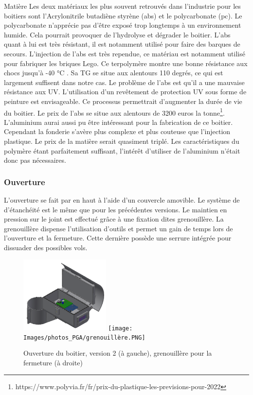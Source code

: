 Matière
Les deux matériaux les plus souvent retrouvés dans l’industrie pour les boitiers sont l’Acrylonitrile 
butadiène styrène (abs) et le polycarbonate (pc). Le polycarbonate n’apprécie pas d’être exposé trop 
longtemps à un environnement humide. Cela pourrait provoquer de l’hydrolyse et dégrader le boitier. 
L’abs quant à lui est très résistant, il est notamment utilisé pour faire des barques de secours.  
L’injection de l’abs est très rependue, ce matériau est notamment utilisé pour fabriquer les briques Lego. 
Ce terpolymère montre une bonne résistance aux chocs jusqu'à -40 °C . Sa TG se situe aux alentours 110 
degrés, ce qui est largement suffisent dans notre cas. Le problème de l’abs est qu’il a une mauvaise 
résistance aux UV. L’utilisation d’un revêtement de protection UV sous forme de peinture est envisageable. 
Ce processus permettrait d’augmenter la durée de vie du boitier. Le prix de l’abs se situe aux alentours 
de 3200 euros la tonne\footnote{https://www.polyvia.fr/fr/prix-du-plastique-les-previsions-pour-2022}.\\
L’aluminium aurai aussi pu être intéressant pour la fabrication de ce boitier. Cependant la fonderie 
s’avère plus complexe et plus couteuse que l’injection plastique. Le prix de la matière serait quasiment 
triplé. Les caractéristiques du polymère étant parfaitement suffisant, l’intérêt d’utiliser de l’aluminium 
n’était donc pas nécessaires.

\subsubsection{Ouverture}

L’ouverture se fait par en haut à l’aide d’un couvercle amovible. Le système de d’étanchéité est le 
même que pour les précédentes versions. Le maintien en pression sur le joint est effectué grâce à 
une fixation dites grenouillère. La grenouillère dispense l’utilisation d’outils et permet un gain 
de temps lors de l’ouverture et la fermeture. Cette dernière possède une serrure intégrée pour dissuader 
des possibles vols.

\begin{figure}[H]
    \centering
    \includegraphics[width=0.4\textwidth]{Images/photos_PGA/Boitierv41.PNG}
    \texttt{[image: Images/photos\_PGA/grenouillère.PNG]}
    \caption{Ouverture du boitier, version 2 (à gauche), grenouillère pour la fermeture (à droite)}
    \label{fig:ouverturev2}
\end{figure}

